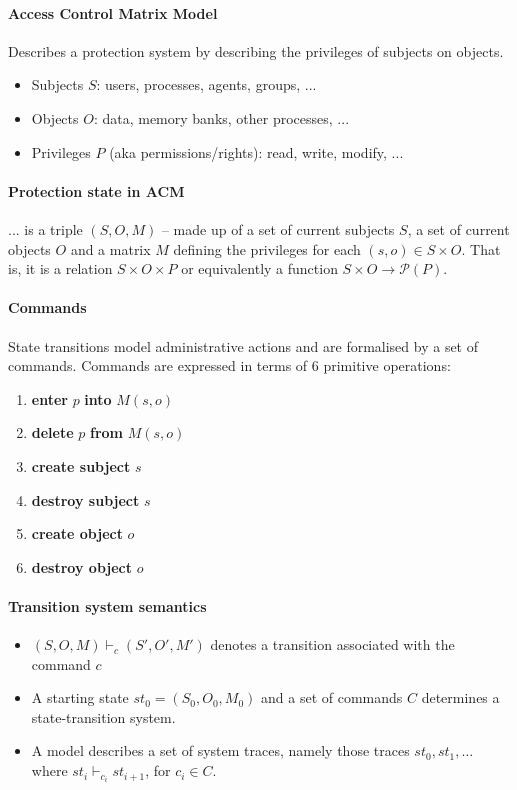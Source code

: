 \paragraph{Access Control Matrix Model} Describes a protection system by describing the privileges of subjects on objects.

\begin{itemize}
    \item Subjects $S$: users, processes, agents, groups, ...
    \item Objects $O$: data, memory banks, other processes, ...
    \item Privileges $P$ (aka permissions/rights): read, write, modify, ...
\end{itemize}

\paragraph{Protection state in ACM} ... is a triple $(S, O, M)$ -- made up of a set of current subjects $S$, a set of current objects $O$ and a matrix $M$ defining the privileges for each $(s, o) \in S \times O$. That is, it is a relation $S \times O \times P$ or equivalently a function $S \times O \rightarrow \mathcal{P}(P)$.

\paragraph{Commands} State transitions model administrative actions and are formalised by a set of commands. Commands are expressed in terms of 6 primitive operations:

\begin{enumerate}
    \item \textbf{enter} $p$ \textbf{into} $M(s, o)$
    \item \textbf{delete} $p$ \textbf{from} $M(s, o)$
    \item \textbf{create subject} $s$
    \item \textbf{destroy subject} $s$
    \item \textbf{create object} $o$
    \item \textbf{destroy object} $o$
\end{enumerate}

\paragraph{Transition system semantics}
\begin{itemize}
    \item $(S, O, M) \vdash_c (S', O', M')$ denotes a transition associated with the command $c$
    \item A starting state $st_0 = (S_0 , O_0 , M_0)$ and a set of commands $C$ determines a state-transition system.
    \item A model describes a set of system traces, namely those traces $st_0, st_1,\dots$ where $st_i \vdash_{c_i} st_{i + 1}$, for $c_i \in C$.
\end{itemize}

